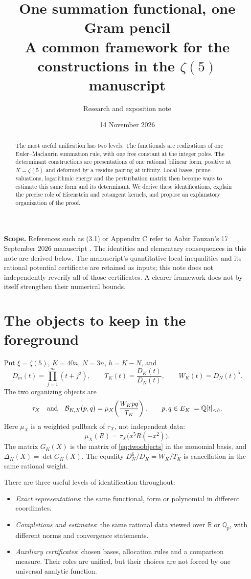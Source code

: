 \documentclass[11pt]{article}
\title{One summation functional, one Gram pencil\\[3pt]
\large A common framework for the constructions in the $\zeta(5)$ manuscript}
\author{Research and exposition note}
\date{14 November 2026}
\theoremstyle{definition}
\theoremstyle{remark}\newtheorem*{remark}{Remark}
\newcommand{\Q}{\mathbb Q}
\newcommand{\R}{\mathbb R}
\newcommand{\pair}{\mathcal B}
\begin{document}
\maketitle
\begin{abstract}
The most useful unification has two levels. The functionals are realizations of
one Euler--Maclaurin summation rule, with one free constant at the integer poles.
The determinant constructions are presentations of one rational bilinear form,
positive at $X=\zeta(5)$ and deformed by a residue pairing at infinity.
Local bases, prime valuations, logarithmic energy and the perturbation matrix
then become ways to estimate this same form and its determinant. We derive
these identifications, explain the precise role of Eisenstein and cotangent
kernels, and propose an explanatory organization of the proof.
\end{abstract}

\textbf{Scope.} References such as (3.1) or Appendix C refer to Aabir Fauzan's
17 September 2026 manuscript \cite{F}. The identities and elementary consequences
in this note are derived below. The manuscript's quantitative local inequalities
and its rational potential certificate are retained as inputs; this note does
not independently reverify all of those certificates. A clearer framework does
not by itself strengthen their numerical bounds.

\section{The objects to keep in the foreground}

Put $\xi=\zeta(5)$, $K=40n$, $N=3n$, $h=K-N$, and
\[
 D_m(t)=\prod_{j=1}^m(t+j^2),\qquad
 T_K(t)=\frac{D_K(t)}{D_N(t)},\qquad W_K(t)=D_N(t)^5.
\]
The two organizing objects are
\begin{equation}\label{eq:twoobjects}
 \tau_X\quad\hbox{and}\quad
 \pair_{K,X}(p,q)=\mu_X\!\left(\frac{W_Kpq}{T_K}\right),
 \qquad p,q\in E_K:=\Q[t]_{<h}.
\end{equation}
Here $\mu_X$ is a weighted pullback of $\tau_X$, not independent data:
\begin{equation}\label{eq:pullback}
 \mu_X(R)=\tau_X\bigl(x^5R(-x^2)\bigr).
\end{equation}
The matrix $G_K(X)$ is the matrix of \eqref{eq:twoobjects} in the monomial basis,
and $\Delta_K(X)=\det G_K(X)$. The equality
$D_N^6/D_K=W_K/T_K$ is cancellation in the same rational weight.

There are three useful levels of identification throughout:
\begin{itemize}
\item \emph{Exact representations}: the same functional, form or polynomial in
different coordinates.
\item \emph{Completions and estimates}: the same rational data viewed over
$\R$ or $\Q_p$, with different norms and convergence statements.
\item \emph{Auxiliary certificates}: chosen bases, allocation rules and a
comparison measure. Their roles are unified, but their choices are not forced
by one universal analytic function.
\end{itemize}
\end{document}
